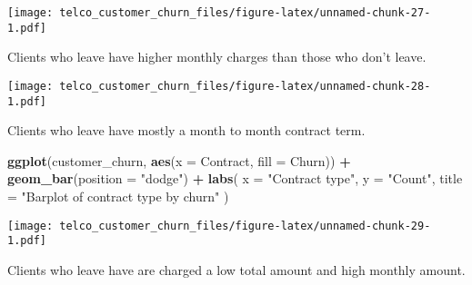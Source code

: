 \documentclass[
  a4paper]{article}
\newenvironment{Shaded}{\begin{snugshade}}{\end{snugshade}}
\newcommand{\AttributeTok}[1]{\textcolor[rgb]{0.13,0.29,0.53}{#1}}
\newcommand{\FunctionTok}[1]{\textcolor[rgb]{0.13,0.29,0.53}{\textbf{#1}}}
\newcommand{\NormalTok}[1]{#1}
\newcommand{\SpecialCharTok}[1]{\textcolor[rgb]{0.81,0.36,0.00}{\textbf{#1}}}
\newcommand{\StringTok}[1]{\textcolor[rgb]{0.31,0.60,0.02}{#1}}
\begin{document}
\texttt{[image: telco\_customer\_churn\_files/figure-latex/unnamed-chunk-27-1.pdf]}

Clients who leave have higher monthly charges than those who don't
leave.

\begin{Shaded}
\end{Shaded}

\texttt{[image: telco\_customer\_churn\_files/figure-latex/unnamed-chunk-28-1.pdf]}

Clients who leave have mostly a month to month contract term.

\begin{Shaded}
\begin{Highlighting}[]
\FunctionTok{ggplot}\NormalTok{(customer\_churn, }\FunctionTok{aes}\NormalTok{(}\AttributeTok{x =}\NormalTok{ Contract, }\AttributeTok{fill =}\NormalTok{ Churn)) }\SpecialCharTok{+}
  \FunctionTok{geom\_bar}\NormalTok{(}\AttributeTok{position =} \StringTok{"dodge"}\NormalTok{) }\SpecialCharTok{+}
  \FunctionTok{labs}\NormalTok{(}
    \AttributeTok{x =} \StringTok{"Contract type"}\NormalTok{,}
    \AttributeTok{y =} \StringTok{"Count"}\NormalTok{,}
    \AttributeTok{title =} \StringTok{"Barplot of contract type by churn"}
\NormalTok{  )}
\end{Highlighting}
\end{Shaded}

\texttt{[image: telco\_customer\_churn\_files/figure-latex/unnamed-chunk-29-1.pdf]}

Clients who leave have are charged a low total amount and high monthly
amount.

\begin{Shaded}
\end{Shaded}
\end{document}
